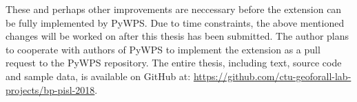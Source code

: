 These and perhaps other improvements are neccessary before the
extension can be fully implemented by PyWPS. Due to time constraints,
the above mentioned changes will be worked on after this thesis has
been submitted. The author plans to cooperate with authors of PyWPS to
implement the extension as a pull request to the PyWPS repository.
The entire thesis, including text, source code and sample data, 
is available on GitHub at: \href{https://github.com/ctu-geoforall-lab-projects/bp-pisl-2018}{https://github.com/ctu-geoforall-lab-projects/bp-pisl-2018}.


